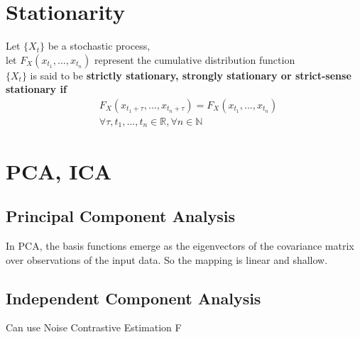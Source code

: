 \documentclass[../main.tex]{subfiles}
\begin{document}
\section{Stationarity}
Let $\{ X_t \}$ be a stochastic process, \\
let $F_X(x_{t_1}, ..., x_{t_n})$ represent the cumulative distribution function \\
$\{ X_t \}$ is said to be \textbf{strictly stationary, strongly stationary or strict-sense stationary if}
\begin{align*}
    &F_X(x_{t_1+\tau}, ..., x_{t_n+\tau}) = F_X(x_{t_1}, ..., x_{t_n}) \\
    &\forall \tau, t_1, ..., t_n \in \mathbb{R}, \forall n \in \mathbb{N}
\end{align*}







\section{PCA, ICA}
\subsection{Principal Component Analysis}
In PCA, the basis functions emerge as the eigenvectors of the covariance matrix over observations of
the input data. So the mapping is linear and shallow.

\subsection{Independent Component Analysis}
Can use Noise Contrastive Estimation
F
\end{document}

